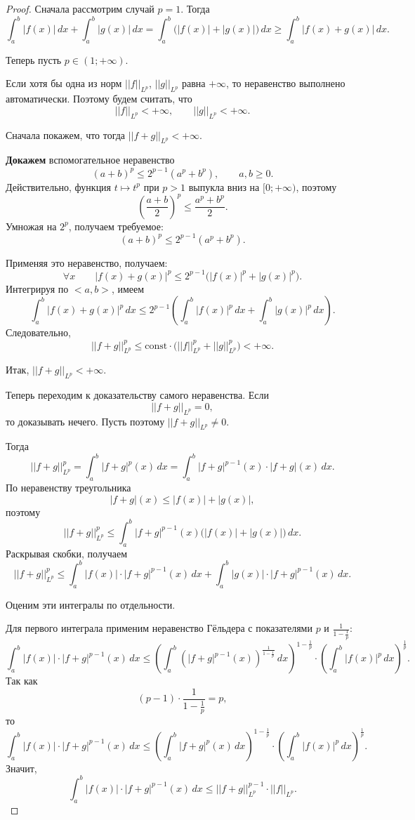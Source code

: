 \begin{proof}
	Сначала рассмотрим случай $p=1$. Тогда
	\[
	\int_a^b |f(x)|\,dx + \int_a^b |g(x)|\,dx
	=
	\int_a^b \bigl(|f(x)|+|g(x)|\bigr)\,dx
	\ge
	\int_a^b |f(x)+g(x)|\,dx.
	\]
	
	Теперь пусть $p\in(1;+\infty)$.
	
	Если хотя бы одна из норм $||f||_{L^p}$, $||g||_{L^p}$ равна $+\infty$, то неравенство выполнено автоматически. Поэтому будем считать, что
	\[
	||f||_{L^p}<+\infty,
	\qquad
	||g||_{L^p}<+\infty.
	\]
	
	Сначала покажем, что тогда $||f+g||_{L^p}<+\infty$.
	
	\textbf{Докажем} вспомогательное неравенство
	\[
	(a+b)^p \le 2^{p-1}(a^p+b^p),
	\qquad a,b\ge 0.
	\]
	Действительно, функция $t\mapsto t^p$ при $p>1$ выпукла вниз на $[0;+\infty)$, поэтому
	\[
	\left(\frac{a+b}{2}\right)^p \le \frac{a^p+b^p}{2}.
	\]
	Умножая на $2^p$, получаем требуемое:
	\[
	(a+b)^p \le 2^{p-1}(a^p+b^p).
	\]
	
	Применяя это неравенство, получаем:
	\[
	\forall x \qquad |f(x)+g(x)|^p \le 2^{p-1}\bigl(|f(x)|^p+|g(x)|^p\bigr).
	\]
	Интегрируя по $<a,b>$, имеем
	\[
	\int_a^b |f(x)+g(x)|^p\,dx
	\le
	2^{p-1}\left(\int_a^b |f(x)|^p\,dx + \int_a^b |g(x)|^p\,dx\right).
	\]
	Следовательно,
	\[
	||f+g||_{L^p}^p
	\le
	\mathrm{const}\cdot\bigl(||f||_{L^p}^p+||g||_{L^p}^p\bigr)<+\infty.
	\]
	
	Итак, $||f+g||_{L^p}<+\infty$.
	
	Теперь переходим к доказательству самого неравенства. Если
	\[
	||f+g||_{L^p}=0,
	\]
	то доказывать нечего. Пусть поэтому $||f+g||_{L^p}\ne 0$.
	
	Тогда
	\[
	||f+g||_{L^p}^p
	=
	\int_a^b |f+g|^p(x)\,dx
	=
	\int_a^b |f+g|^{p-1}(x)\cdot |f+g|(x)\,dx.
	\]
	По неравенству треугольника
	\[
	|f+g|(x)\le |f(x)|+|g(x)|,
	\]
	поэтому
	\[
	||f+g||_{L^p}^p
	\le
	\int_a^b |f+g|^{p-1}(x)\bigl(|f(x)|+|g(x)|\bigr)\,dx.
	\]
	Раскрывая скобки, получаем
	\[
	||f+g||_{L^p}^p
	\le
	\int_a^b |f(x)|\cdot |f+g|^{p-1}(x)\,dx
	+
	\int_a^b |g(x)|\cdot |f+g|^{p-1}(x)\,dx.
	\]
	
	Оценим эти интегралы по отдельности.
	
	Для первого интеграла применим неравенство Гёльдера с показателями $p$ и $\frac{1}{1-\frac{1}{p}}$:
	\[
	\int_a^b |f(x)|\cdot |f+g|^{p-1}(x)\,dx
	\le
	\left(\int_a^b \left(|f+g|^{p-1}(x)\right)^{\frac{1}{1-\frac{1}{p}}}\,dx\right)^{1-\frac{1}{p}}
	\cdot
	\left(\int_a^b |f(x)|^p\,dx\right)^{\frac{1}{p}}.
	\]
	Так как
	\[
	(p-1)\cdot \frac{1}{1-\frac{1}{p}} = p,
	\]
	то
	\[
	\int_a^b |f(x)|\cdot |f+g|^{p-1}(x)\,dx
	\le
	\left(\int_a^b |f+g|^p(x)\,dx\right)^{1-\frac{1}{p}}
	\cdot
	\left(\int_a^b |f(x)|^p\,dx\right)^{\frac{1}{p}}.
	\]
	Значит,
	\[
	\int_a^b |f(x)|\cdot |f+g|^{p-1}(x)\,dx
	\le
	||f+g||_{L^p}^{p-1}\cdot ||f||_{L^p}.
	\]
	

\end{proof}

